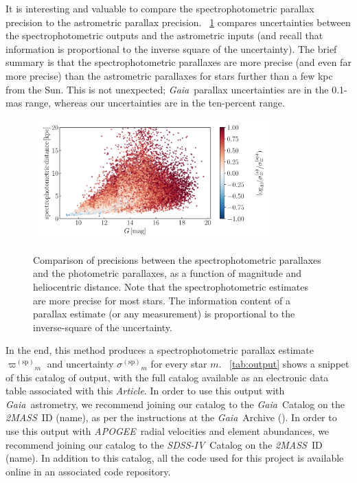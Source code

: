 \documentclass[modern]{aastex62}
\newcommand{\documentname}{\textsl{Article}}
\newcommand{\acronym}[1]{{\small{#1}}}
\newcommand{\project}[1]{\textsl{#1}}
\newcommand{\apogee}{\project{\acronym{APOGEE}}}
\newcommand{\gaia}{\project{Gaia}}
\newcommand{\zmass}{\project{\acronym{2MASS}}}
\newcommand{\sdssiv}{\project{\acronym{SDSS-IV}}}
\newcommand{\sparallax}{{\varpi^{(\mathrm{sp})}}}
\newcommand{\ssigma}{{\sigma^{(\mathrm{sp})}}}
\begin{document}
It is interesting and valuable to compare the spectrophotometric parallax precision to
the astrometric parallax precision.
\figurename~\ref{fig:precision} compares uncertainties between the spectrophotometric
outputs and the astrometric inputs
(and recall that information is proportional to the inverse square of the uncertainty).
The brief summary is that the spectrophotometric parallaxes are more precise (and even
far more precise) than the astrometric parallaxes for stars further than a few kpc from
the Sun.
This is not unexpected; \gaia\ parallax uncertainties are in the 0.1-mas range, whereas
our uncertainties are in the ten-percent range.
\begin{figure}
\centering
~\hfill\includegraphics[width=0.8\textwidth]{./precision.pdf}\hfill~
\caption{Comparison of precisions between the spectrophotometric parallaxes and
the photometric parallaxes, as a function of magnitude and heliocentric distance.
Note that the spectrophotometric estimates are more precise for most stars.
The information content of a parallax estimate (or any measurement)
is proportional to the inverse-square of the uncertainty.\label{fig:precision}}
\end{figure}

In the end, this method produces a spectrophotometric parallax estimate $\sparallax_m$
and uncertainty $\ssigma_m$ for every star $m$.
\tablename~\ref{tab:output} shows a snippet of this catalog of output, with the full catalog available
as an electronic data table associated with this \documentname.
In order to use this output with \gaia\ astrometry, we recommend joining our catalog to the
\gaia\ Catalog on the \zmass\ ID (name), as per the instructions at the \gaia\ Archive (\citealt{gaiaarchive}).
In order to use this output with \apogee\ radial velocities and element abundances, we recommend
joining our catalog to the \sdssiv\ Catalog on the \zmass\ ID (name).
In addition to this catalog, all the code used for this project is available online in an associated
code repository.
\end{document}
